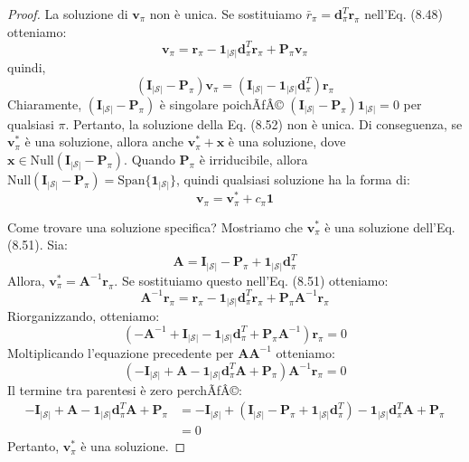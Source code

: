 ﻿\documentclass[11pt, a4paper]{report}
\begin{document}
\begin{proof}
La soluzione di $\bm{v}_{\pi}$ non è unica. Se sostituiamo $\bar{r}_{\pi} = \bm{d}_{\pi}^T \bm{r}_{\pi}$ nell'Eq. (8.48) otteniamo:
\begin{equation}
\bm{v}_{\pi} = \bm{r}_{\pi} - \bm{1}_{|\mathcal{S}|} \bm{d}_{\pi}^T \bm{r}_{\pi} + \bm{P}_{\pi} \bm{v}_{\pi}
\end{equation}
quindi,
\begin{equation}
(\bm{I}_{|\mathcal{S}|} - \bm{P}_{\pi}) \bm{v}_{\pi} = (\bm{I}_{|\mathcal{S}|} - \bm{1}_{|\mathcal{S}|} \bm{d}_{\pi}^T) \bm{r}_{\pi}
\end{equation}
Chiaramente, $(\bm{I}_{|\mathcal{S}|} - \bm{P}_{\pi})$ è singolare poichÃƒÂ© $(\bm{I}_{|\mathcal{S}|} - \bm{P}_{\pi}) \bm{1}_{|\mathcal{S}|} = 0$ per qualsiasi $\pi$. Pertanto, la soluzione della Eq. (8.52) non è unica. Di conseguenza, se $\bm{v}_{\pi}^*$ è una soluzione, allora anche $\bm{v}_{\pi}^* + \bm{x}$ è una soluzione, dove $\bm{x} \in \text{Null}(\bm{I}_{|\mathcal{S}|} - \bm{P}_{\pi})$. Quando $\bm{P}_{\pi}$ è irriducibile, allora $\text{Null}(\bm{I}_{|\mathcal{S}|} - \bm{P}_{\pi}) = \text{Span}\{\bm{1}_{|\mathcal{S}|}\}$, quindi qualsiasi soluzione ha la forma di:
\begin{equation}
\bm{v}_{\pi} = \bm{v}_{\pi}^* + c_{\pi} \bm{1}
\end{equation}

Come trovare una soluzione specifica? Mostriamo che $\bm{v}_{\pi}^*$ è una soluzione dell'Eq. (8.51). Sia:
\begin{equation}
\bm{A} = \bm{I}_{|\mathcal{S}|} - \bm{P}_{\pi} + \bm{1}_{|\mathcal{S}|} \bm{d}_{\pi}^T
\end{equation}
Allora, $\bm{v}_{\pi}^* = \bm{A}^{-1} \bm{r}_{\pi}$. Se sostituiamo questo nell'Eq. (8.51) otteniamo:
\begin{equation}
\bm{A}^{-1} \bm{r}_{\pi} = \bm{r}_{\pi} - \bm{1}_{|\mathcal{S}|} \bm{d}_{\pi}^T \bm{r}_{\pi} + \bm{P}_{\pi} \bm{A}^{-1} \bm{r}_{\pi}
\end{equation}
Riorganizzando, otteniamo:
\begin{equation}
(-\bm{A}^{-1} + \bm{I}_{|\mathcal{S}|} - \bm{1}_{|\mathcal{S}|} \bm{d}_{\pi}^T + \bm{P}_{\pi} \bm{A}^{-1}) \bm{r}_{\pi} = 0
\end{equation}
Moltiplicando l'equazione precedente per $\bm{A} \bm{A}^{-1}$ otteniamo:
\begin{equation}
(-\bm{I}_{|\mathcal{S}|} + \bm{A} - \bm{1}_{|\mathcal{S}|} \bm{d}_{\pi}^T \bm{A} + \bm{P}_{\pi}) \bm{A}^{-1} \bm{r}_{\pi} = 0
\end{equation}
Il termine tra parentesi è zero perchÃƒÂ©:
\begin{align*}
-\bm{I}_{|\mathcal{S}|} + \bm{A} - \bm{1}_{|\mathcal{S}|} \bm{d}_{\pi}^T \bm{A} + \bm{P}_{\pi} &= -\bm{I}_{|\mathcal{S}|} + (\bm{I}_{|\mathcal{S}|} - \bm{P}_{\pi} + \bm{1}_{|\mathcal{S}|} \bm{d}_{\pi}^T) - \bm{1}_{|\mathcal{S}|} \bm{d}_{\pi}^T \bm{A} + \bm{P}_{\pi} \\
&= 0
\end{align*}
Pertanto, $\bm{v}_{\pi}^*$ è una soluzione.


\end{proof}
\end{document}
